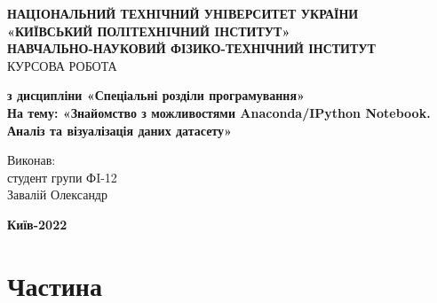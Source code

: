 \documentclass[a4paper,12pt]{article}
\begin{document}
\begin{center}
    \hfill \break
    \large{\textbf{НАЦIОНАЛЬНИЙ ТЕХНIЧНИЙ УНIВЕРСИТЕТ УКРАЇНИ\\
            «КИЇВСЬКИЙ ПОЛIТЕХНIЧНИЙ IНСТИТУТ»\\
            НАВЧАЛЬНО-НАУКОВИЙ ФІЗИКО-ТЕХНІЧНИЙ ІНСТИТУТ}}\\
    \hfill \break \hfill \break \hfill\break \hfill \break \hfill \break \hfill \break \hfill \break
    \hfill \break \hfill \break
    \large{КУРСОВА РОБОТА}
    \begin{center}
        \normalsize{\textbf{з дисципліни «Спеціальні розділи програмування» \\
        На тему: «Знайомство з можливостями Anaconda/IPython Notebook. \\
        Аналіз та візуалізація даних датасету» \\}}
    \end{center}
\end{center}
\hfill \break \hfill \break \hfill \break \hfill \break \hfill \break \hfill \break \hfill \break
\hfill \break \hfill \break \hfill \break \hfill \break \hfill \break \hfill \break 
\begin{flushright}
    \large{ \hspace{35pt} Виконав:\\
        студент групи ФI-12\\
        Завалій Олександр} 
\end{flushright}
\hfill \break \hfill \break \hfill \break \hfill \break \hfill \break \hfill \break \hfill \break
\hfill \break \hfill \break 
\begin{center} \textbf{Київ-2022} \end{center}
\thispagestyle{empty}



\newpage
    \renewcommand*\contentsname{Contents}
    \tableofcontents


\newpage
    \section {Частина}
\end{document}
